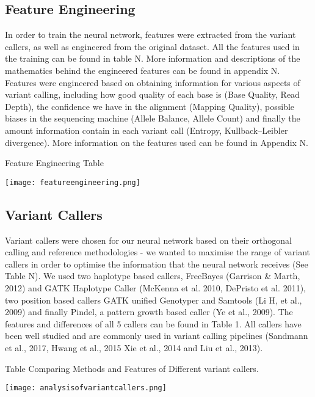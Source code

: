 \documentclass{article}
\begin{document}
\subsection{Feature Engineering}
In order to train the neural network, features were extracted from the variant callers, as well as engineered from the original dataset. All the features used in the training can be found in table N. More information and descriptions of the mathematics behind the engineered features can be found in appendix N. Features were engineered based on obtaining information for various aspects of variant calling, including how good quality of each base is (Base Quality, Read Depth), the confidence we have in the alignment (Mapping Quality), possible biases in the sequencing machine (Allele Balance, Allele Count) and finally the amount information contain in each variant call (Entropy, Kullback–Leibler divergence). More information on the features used can be found in Appendix N.

\begin{table}[H]
\caption{Feature Engineering Table}
\texttt{[image: featureengineering.png]}
\centering
\end{table}


\subsection{Variant Callers}
Variant callers were chosen for our neural network based on their orthogonal calling and reference methodologies - we wanted to maximise the range of variant callers in order to optimise the information that the neural network receives (See Table N). We used two haplotype based callers, FreeBayes (Garrison \& Marth, 2012) and GATK Haplotype Caller (McKenna et al. 2010, DePristo et al. 2011), two position based callers GATK unified Genotyper and Samtools (Li H, et al., 2009) and finally Pindel, a pattern growth based caller (Ye et al., 2009). The features and differences of all 5 callers can be found in Table 1.  All callers have been well studied and are commonly used in variant calling pipelines (Sandmann et al., 2017, Hwang et al., 2015 Xie et al., 2014 and Liu et al., 2013). 

\begin{table}[H]
\caption{Table Comparing Methods and Features of Different variant callers.}
\texttt{[image: analysisofvariantcallers.png]}
\centering
\end{table}
\end{document}
